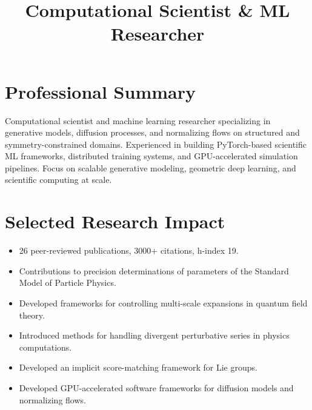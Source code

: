 \documentclass[12pt,a4paper,sans]{moderncv}
\title{Computational Scientist \& ML Researcher}
\begin{document}
\makecvtitle


\section{Professional Summary}

Computational scientist and machine learning researcher specializing in generative models, diffusion processes, and normalizing flows on structured and symmetry-constrained domains. Experienced in building PyTorch-based scientific ML frameworks, distributed training systems, and GPU-accelerated simulation pipelines. Focus on scalable generative modeling, geometric deep learning, and scientific computing at scale.


 
\section*{Selected Research Impact}

\begin{itemize}[leftmargin=*]
    \item 26 peer-reviewed publications, 3000+ citations, h-index 19.
    \item Contributions to precision determinations of parameters of the Standard Model of Particle Physics.
    \item Developed frameworks for controlling multi-scale expansions in quantum field theory.
    \item Introduced methods for handling divergent perturbative series in physics computations.
    \item Developed an implicit score-matching framework for Lie groups.
    \item Developed GPU-accelerated software frameworks for diffusion models and normalizing flows.
\end{itemize}
\end{document}

